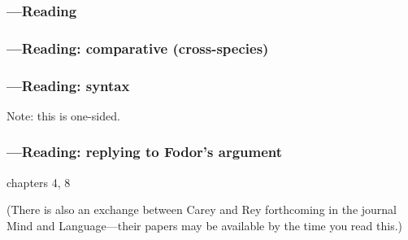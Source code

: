 \documentclass[12pt,\papersize]{extarticle}
\begin{document}
\subsubsection{---Reading}


\subsubsection{---Reading: comparative (cross-species)}




\subsubsection{---Reading: syntax}

Note: this is one-sided.






\subsubsection{---Reading: replying to Fodor’s argument}


 chapters 4, 8

(There is also an exchange between Carey and Rey forthcoming in the journal Mind and Language---their papers may be available by the time you read this.)



%
\end{document}
